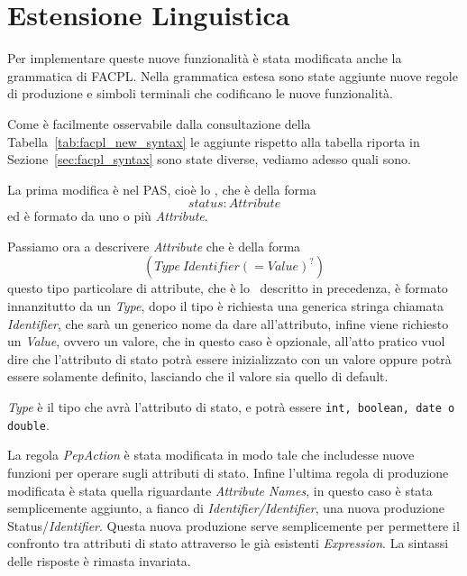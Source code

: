 
\section{Estensione Linguistica} %
\label{sec:estensione_linguistica}
Per implementare queste nuove funzionalità è stata modificata anche la grammatica di FACPL.
Nella grammatica estesa sono state aggiunte nuove regole di produzione e simboli terminali che 
codificano le nuove funzionalità.\\ \par

Come è facilmente osservabile dalla consultazione della Tabella~\ref{tab:facpl_new_syntax} le aggiunte rispetto alla tabella riporta in Sezione~\ref{sec:facpl_syntax} sono state diverse, vediamo adesso quali sono.\\ \par
La prima modifica è nel PAS, cioè  lo \status, che è della forma $$status: Attribute$$ ed è formato da uno o più \textit{Attribute}.\\ \par
Passiamo ora a descrivere \textit{Attribute} che è della forma $$(Type\ Identifier (= Value)^?)$$
questo tipo particolare di attribute, che è lo \statusattribute \ descritto in precedenza, è formato innanzitutto da un \textit{Type}, dopo il tipo è richiesta una generica stringa chiamata \textit{Identifier}, che sarà un generico nome da dare all'attributo, infine viene richiesto un \textit{Value}, ovvero un valore, che in questo caso è opzionale, all'atto pratico vuol dire che l'attributo di stato potrà essere inizializzato con un valore oppure potrà essere solamente definito, lasciando che il valore sia quello di default.

\textit{Type} è il tipo che avrà l'attributo di stato, e potrà essere \texttt{int, boolean, date o double}.\\ \par
La regola \textit{PepAction} è stata modificata in modo tale che includesse nuove funzioni per operare sugli attributi di stato.
Infine l'ultima regola di produzione modificata è stata quella riguardante \textit{Attribute Names}, in questo caso è stata semplicemente aggiunto, a fianco di \textit{Identifier/Identifier}, una nuova produzione Status/\textit{Identifier}. Questa nuova produzione serve semplicemente per permettere il confronto tra attributi di stato attraverso le già esistenti \textit{Expression}.
La sintassi delle risposte è rimasta invariata.

